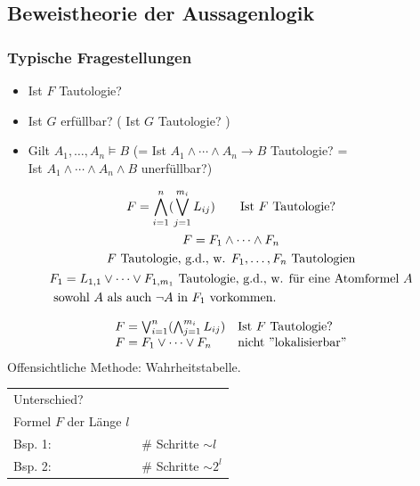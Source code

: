 \subsection{Beweistheorie der Aussagenlogik}
\subsubsection{Typische Fragestellungen}
\begin{itemize}
	\item Ist $F$ Tautologie?
	\item Ist $G$ erfüllbar? \qquad ( Ist $G$ Tautologie? )
	\item Gilt $A_1 , \dotsc , A_n \models B$ \quad (= Ist $A_1 \wedge \dotsb \wedge A_n \rightarrow B$ Tautologie? = \\
		Ist $A_1 \wedge \dotsb \wedge A_n \wedge B$ unerfüllbar?)
\end{itemize}
\begin{bsp}
	\begin{gather*}
		F = \bigwedge_{i=1}^n ( \bigvee_{j=1}^{m_i} L_{ij} ) \qquad \text{Ist } F \text{ Tautologie?} \\
		F = F_1 \wedge \dotsb \wedge F_n \\
		F \text{ Tautologie, g.d., w. } F_1 , \dotsc , F_n \text{ Tautologien} \\
		\begin{split}
			& F_1 = L_{1,1} \vee \dotsb \vee F_{1,m_1} \text{ Tautologie, g.d., w. für eine Atomformel } A \\
			& \text{ sowohl } A \text{ als auch } \neg A \text{ in } F_1 \text{ vorkommen.}
		\end{split}
	\end{gather*}
\end{bsp}
\begin{bsp}
	\begin{gather*}
		\begin{array}{ l l }
			F = \bigvee_{i=1}^n ( \bigwedge_{j=1}^{m_i} L_{ij} )		& \text{Ist } F \text{ Tautologie?} \\
			F = F_1 \vee \dotsb \vee F_n					& \text{nicht ''lokalisierbar''}
		\end{array}
	\end{gather*}
	Offensichtliche Methode: Wahrheitstabelle. \\
	\begin{tabular}{ l l}
		Unterschied? \\
		Formel $F$ der Länge $l$			\\
		Bsp. 1: 	& \# Schritte $\sim l$		\\
		Bsp. 2: 	& \# Schritte $\sim 2^l$
	\end{tabular}
\end{bsp}

